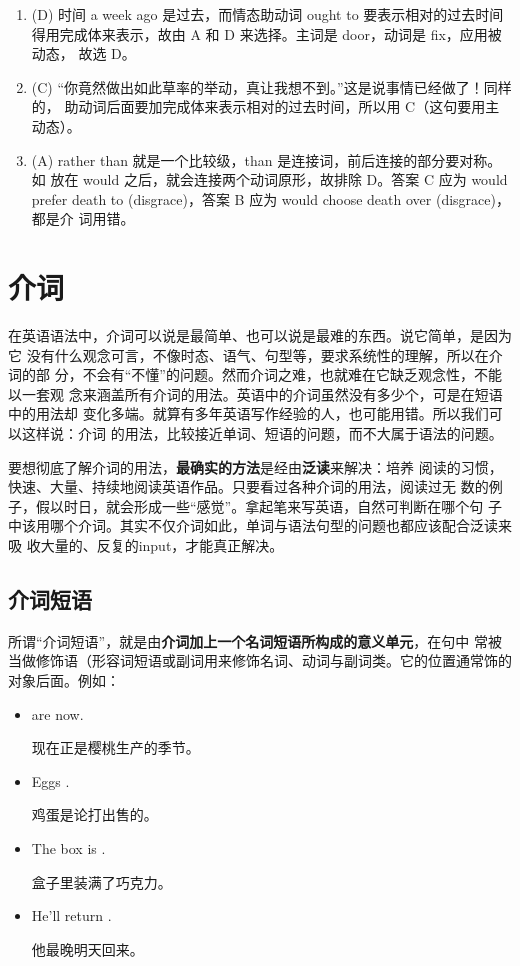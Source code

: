 \begin{enumerate}
\item (D) 时间 a week ago 是过去，而情态助动词 ought to 要表示相对的过去时间
  得用完成体来表示，故由 A 和 D 来选择。主词是 door，动词是 fix，应用被动态，
  故选 D。

\item (C) “你竟然做出如此草率的举动，真让我想不到。”这是说事情已经做了！同样的，
  助动词后面要加完成体来表示相对的过去时间，所以用 C（这句要用主动态）。
\item (A) rather than 就是一个比较级，than 是连接词，前后连接的部分要对称。如
  放在 would 之后，就会连接两个动词原形，故排除 D。答案 C 应为 would prefer
  death to (disgrace)，答案 B 应为 would choose death over (disgrace)，都是介
  词用错。

\end{enumerate}

\chapter{介词}

在英语语法中，介词可以说是最简单、也可以说是最难的东西。说它简单，是因为它
没有什么观念可言，不像时态、语气、句型等，要求系统性的理解，所以在介词的部
分，不会有“不懂”的问题。然而介词之难，也就难在它缺乏观念性，不能以一套观
念来涵盖所有介词的用法。英语中的介词虽然没有多少个，可是在短语中的用法却
变化多端。就算有多年英语写作经验的人，也可能用错。所以我们可以这样说：介词
的用法，比较接近单词、短语的问题，而不大属于语法的问题。

要想彻底了解介词的用法，\textbf{最确实的方法}是经由\textbf{泛读}来解决：培养
阅读的习惯，快速、大量、持续地阅读英语作品。只要看过各种介词的用法，阅读过无
数的例子，假以时日，就会形成一些“感觉”。拿起笔来写英语，自然可判断在哪个句
子中该用哪个介词。其实不仅介词如此，单词与语法句型的问题也都应该配合泛读来吸
收大量的、反复的input，才能真正解决。


\section{介词短语}

所谓“介词短语”，就是由\textbf{介词加上一个名词短语所构成的意义单元}，在句中
常被当做修饰语（形容词短语或副词用来修饰名词、动词与副词类。它的位置通常饰的
对象后面。例如：

\begin{itemize}
\item {} are  now.

  现在正是樱桃生产的季节。
\item Eggs  .

  鸡蛋是论打出售的。
\item The box is  .

  盒子里装满了巧克力。
\item He'll return  .

  他最晚明天回来。
\end{itemize}

